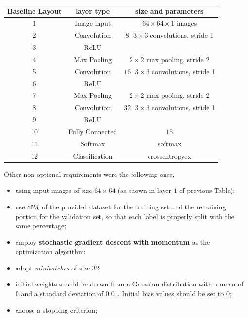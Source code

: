 \documentclass[a4paper, 11pt]{article} %
\begin{document}
\begin{center}
\begin{tabular}{|c|c|c|}
\hline 
Baseline Layout & layer type & size and parameters \\
\hline \hline 
1 & Image input & $64 \times 64 \times 1$ images \\
\hline 
2 & Convolution & $8 \mbox{ } 3 \times 3$ convolutions, stride 1 \\
\hline 
3 & ReLU &  \\
\hline 
4 & Max Pooling & $2 \times 2$ max pooling, stride 2 \\
\hline
5 & Convolution & $16 \mbox{ } 3 \times 3$ convolutions, stride 1 \\
\hline 
6 & ReLU &  \\
\hline 
7 & Max Pooling & $2 \times 2$ max pooling, stride 2 \\
\hline
8 & Convolution & $32 \mbox{ } 3 \times 3$ convolutions, stride 1 \\
\hline 
9 & ReLU & \\
\hline 
10 & Fully Connected & $15$ \\
\hline
11 & Softmax & softmax \\ 
\hline \hline 
12 & Classification & crossentropyex \\
\hline
\end{tabular}
\end{center}
\bigskip

Other non-optional requirements were the following ones,

\begin{itemize}
    \item using input images of size $64 \times 64$ (as shown in layer $1$ of previous Table);
    \item use $85\%$ of the provided dataset for the training set and the remaining portion for the validation set, so that each label is properly split with the same percentage;
    \item employ \textbf{stochastic gradient descent with momentum} as the optimization algorithm;
    \item adopt \emph{minibatches} of size $32$;
    \item initial weights should be drawn from a Gaussian distribution with a mean of $0$ and a standard deviation of $0.01$. Initial bias values should be set to $0$;
    \item choose a stopping criterion;
\end{itemize}
\end{document}

